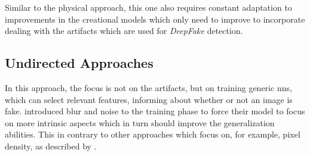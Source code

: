 \par
Similar to the physical approach, this one also requires constant adaptation to
improvements in the creational models which only need to improve to incorporate
dealing with the artifacts which are used for \textit{DeepFake} detection\cite{Mirsky.2020}.

\subsection{Undirected Approaches}
In this approach, the focus is not on the artifacts, but on training generic
\glspl{nn}, which can select relevant features, informing about whether or not
an image is fake. 
\textcite{xuan_generalization_2019} introduced blur and noise to the training phase
to force their model to focus on more intrinsic aspects which in turn should improve
the generalization abilities.
This in contrary to other approaches which focus on, for example, pixel density,
as described by \textcite{Mirsky.2020}.



